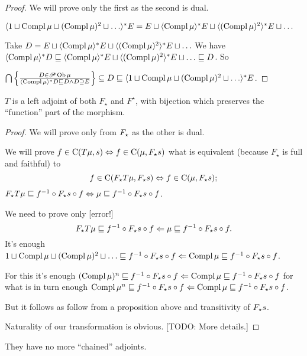 \begin{proof}
  We will prove only the first as the second is dual.
  
  $\langle 1 \sqcup \operatorname{Compl} \mu \sqcup (\operatorname{Compl} \mu)^2 \sqcup \ldots
  \rangle^{\ast} E = E \sqcup \langle \operatorname{Compl} \mu \rangle^{\ast} E \sqcup
  \langle (\operatorname{Compl} \mu)^2 \rangle^{\ast} E \sqcup \ldots$
  
  Take $D = E \sqcup \langle \operatorname{Compl} \mu \rangle^{\ast} E \sqcup \langle
  (\operatorname{Compl} \mu)^2 \rangle^{\ast} E \sqcup \ldots$ We have $\langle
  \operatorname{Compl} \mu \rangle^{\ast} D \sqsubseteq \langle \operatorname{Compl} \mu
  \rangle^{\ast} E \sqcup \langle (\operatorname{Compl} \mu)^2 \rangle^{\ast} E \sqcup
  \ldots \sqsubseteq D$. So
  
  $\bigcap \left\{ \frac{ D \in \mathscr{P} \operatorname{Ob} \mu }{
  \langle \operatorname{Compl} \mu \rangle^{\ast} D \sqsubseteq D \wedge D \supseteq E
  }\right\} \subseteq D \sqsubseteq \langle 1 \sqcup \operatorname{Compl} \mu \sqcup
  (\operatorname{Compl} \mu)^2 \sqcup \ldots \rangle^{\ast} E$.
\end{proof}

\begin{thm}
  $T$ is a left adjoint of both $F_{\star}$ and $F^{\star}$, with bijection
  which preserves the ``function'' part of the morphism.
\end{thm}

\begin{proof}
  We will prove only from $F_{\star}$ as the other is dual.
  
  We will prove $f \in \mathrm{C} (T \mu, s) \Leftrightarrow f \in \mathrm{C}
  (\mu, F_{\star} s)$ what is equivalent
  (because $F_{\star}$ is full and faithful) to
  \[ f \in \mathrm{C} (F_{\star} T \mu, F_{\star} s) \Leftrightarrow f \in
     \mathrm{C} (\mu, F_{\star} s) ; \]
  $F_{\star} T \mu \sqsubseteq f^{- 1} \circ F_{\star} s \circ f
  \Leftrightarrow \mu \sqsubseteq f^{- 1} \circ F_{\star} s \circ f$.
  
  We need to prove only [error!]
  \[ F_{\star} T \mu \sqsubseteq f^{- 1} \circ F_{\star} s \circ f \Leftarrow
     \mu \sqsubseteq f^{- 1} \circ F_{\star} s \circ f. \]
  It's enough $1 \sqcup \operatorname{Compl} \mu \sqcup (\operatorname{Compl} \mu)^2 \sqcup
  \ldots \sqsubseteq f^{- 1} \circ F_{\star} s \circ f \Leftarrow \operatorname{Compl}
  \mu \sqsubseteq f^{- 1} \circ F_{\star} s \circ f$.
  
  For this it's enough $(\operatorname{Compl} \mu)^n \sqsubseteq f^{- 1} \circ
  F_{\star} s \circ f \Leftarrow \operatorname{Compl} \mu \sqsubseteq f^{- 1} \circ
  F_{\star} s \circ f$ for what is in turn enough $\operatorname{Compl} \mu^n
  \sqsubseteq f^{- 1} \circ F_{\star} s \circ f \Leftarrow \operatorname{Compl} \mu
  \sqsubseteq f^{- 1} \circ F_{\star} s \circ f$.
  
  But it follows as follow from a proposition above and transitivity of
  $F_{\star} s$.
  
  Naturality of our transformation is obvious. [TODO: More details.]
\end{proof}

\begin{conjecture}
  They have no more ``chained'' adjoints.
\end{conjecture}
